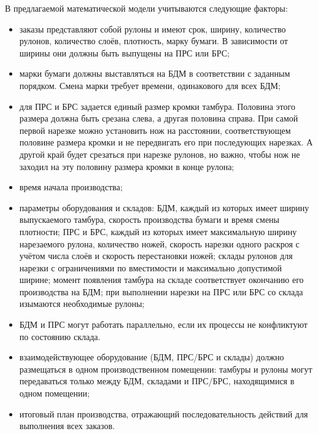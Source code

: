 В предлагаемой математической модели учитываются следующие факторы:
\begin{itemize}
    \item заказы представляют собой рулоны и имеют срок, ширину, количество рулонов, количество слоёв, плотность, марку бумаги.
В зависимости от ширины они должны быть выпущены на ПРС или БРС;
    \item марки бумаги должны выставляться на БДМ в соответствии с заданным порядком.
Смена марки требует времени, одинакового для всех БДМ;
    \item для ПРС и БРС задается единый размер кромки тамбура.
Половина этого размера должна быть срезана слева, а другая половина справа.
При самой первой нарезке можно установить нож на расстоянии, соответствующем половине размера кромки и не передвигать его при последующих нарезках.
А другой край будет срезаться при нарезке рулонов, но важно, чтобы нож не заходил на эту половину размера кромки в конце рулона;
    \item время начала производства;
    \item параметры оборудования и складов: БДМ, каждый из которых имеет ширину выпускаемого тамбура, скорость производства бумаги и время смены плотности; ПРС и БРС, каждый из которых имеет максимальную ширину нарезаемого рулона, количество ножей, скорость нарезки одного раскроя с учётом числа слоёв и скорость перестановки ножей; склады рулонов для нарезки с ограничениями по вместимости и максимально допустимой ширине; момент появления тамбура на складе соответствует окончанию его производства на БДМ; при выполнении нарезки на ПРС или БРС со склада изымаются необходимые рулоны;
    \item БДМ и ПРС могут работать параллельно, если их процессы не конфликтуют по состоянию склада.
    \item взаимодействующее оборудование (БДМ, ПРС/БРС и склады) должно размещаться в одном производственном помещении: тамбуры и рулоны могут передаваться только между БДМ, складами и ПРС/БРС, находящимися в одном помещении;
    \item итоговый план производства, отражающий последовательность действий для выполнения всех заказов.
\end{itemize}

